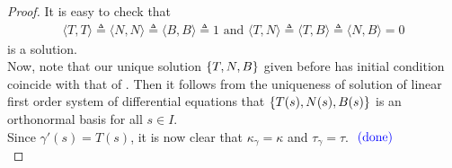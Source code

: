 \documentclass{report}
\begin{document}
\begin{proof}
It is easy to check that 
\begin{align}
\label{sol}
\langle T,T\rangle \triangleq \langle N,N\rangle \triangleq \langle B,B\rangle \triangleq  1\text{ and }\langle T,N\rangle \triangleq \langle T,B\rangle \triangleq \langle N,B\rangle =0 
\end{align}
is a solution.\\

Now, note that our unique solution $\{ T,N,B \}$ given before has initial condition coincide with that of . Then it follows from the uniqueness of solution of linear first order system of differential equations that $\{ T(s),N(s),B(s) \}$ is an orthonormal basis for all $s \in I$.\\

Since $\gamma '(s)=T(s)$, it is now clear that $\kappa_\gamma =\kappa$ and $\tau_\gamma  =\tau$. $\textcolor{blue}{\text{ (done) }}$\\












\end{proof}
\end{document}
